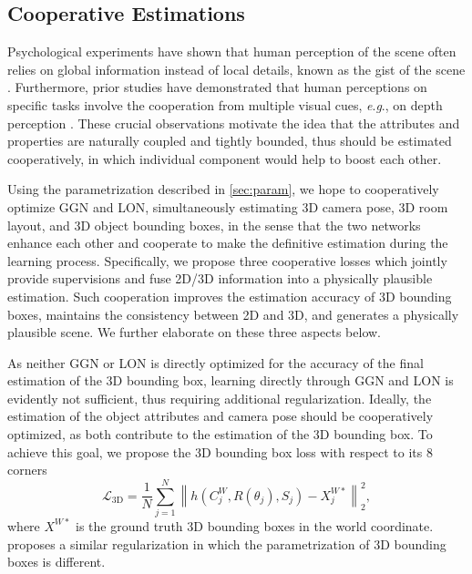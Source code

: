 \documentclass{article}
\makeatletter
\newcommand{\eg}{\textit{e}.\textit{g}.\@\xspace}
\renewcommand{\paragraph}{\@startsection{paragraph}{4}{\z@}{0ex \@plus 0ex \@minus 0ex}{-1em}{\hskip\parindent\normalfont\normalsize\bfseries}}
\makeatother
\begin{document}
\subsection{Cooperative Estimations}

Psychological experiments have shown that human perception of the scene often relies on global information instead of local details, known as the gist of the scene \citep{oliva2005gist,oliva2006building}. Furthermore, prior studies have demonstrated that human perceptions on specific tasks involve the cooperation from multiple visual cues, \eg, on depth perception \citep{landy1995measurement,jacobs2002determines}. These crucial observations motivate the idea that the attributes and properties are naturally coupled and tightly bounded, thus should be estimated cooperatively, in which individual component would help to boost each other.

Using the parametrization described in \autoref{sec:param}, we hope to cooperatively optimize GGN and LON, simultaneously estimating 3D camera pose, 3D room layout, and 3D object bounding boxes, in the sense that the two networks enhance each other and cooperate to make the definitive estimation during the learning process. Specifically, we propose three cooperative losses which jointly provide supervisions and fuse 2D/3D information into a physically plausible estimation. Such cooperation improves the estimation accuracy of 3D bounding boxes, maintains the consistency between 2D and 3D, and generates a physically plausible scene. We further elaborate on these three aspects below.

\paragraph{3D Bounding Box Loss}

As neither GGN or LON is directly optimized for the accuracy of the final estimation of the 3D bounding box, learning directly through GGN and LON is evidently not sufficient, thus requiring additional regularization. Ideally, the estimation of the object attributes and camera pose should be cooperatively optimized, as both contribute to the estimation of the 3D bounding box. To achieve this goal, we propose the 3D bounding box loss with respect to its 8 corners
\begin{equation}
    \mathcal{L}_{\text{3D}} = \frac{1}{N}\sum_{j = 1}^N \left\|h(C^W_j, R(\theta_j), S_j) - X_j^{W*}\right\|_2^2,
\end{equation}
where $X^{W*}$ is the ground truth 3D bounding boxes in the world coordinate. \citet{qi2017frustum} proposes a similar regularization in which the parametrization of 3D bounding boxes is different.
\end{document}
